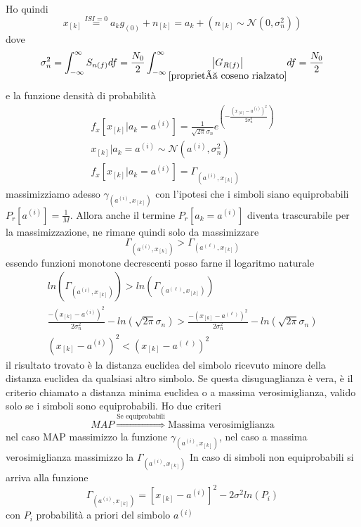             Ho quindi 
            \[
                x_{[k]} \overset{ISI=0}{=} a_kg_{(0)} + n_{[k]} = a_k + (n_{[k]} \sim \mathcal{N}(0,\sigma_n^2))
            \]
            dove 
            \[
                \sigma_n^2 = \int_{-\infty}^{\infty}S_{n(f)}df = \frac{N_0}{2} \int_{-\infty}^{\infty}\underset{\ref{proprietà coseno rialzato}}{\left| G_{R(f)} \right|} df = \frac{N_0}{2}  
            \]
            e la funzione densità di probabilità 
            \begin{gather}
                f_x[x_{[k]}|a_k = a^{(i)}] = \frac{1}{\sqrt{2\pi}\sigma_n}e^{\left(\displaystyle -\frac{(x_{[k]}-a^{(i)})^2}{2\sigma_n^2}\right)} \nonumber \\
                x_{[k]} | a_k = a^{(i)} \sim \mathcal{N}(a^{(i)},\sigma_n^2)\nonumber \\
                f_x[x_{[k]}|a_k = a^{(i)}] = \Gamma_{(a^{(i)},x_{[k]})} \nonumber
            \end{gather}
            massimizziamo adesso $\gamma_{(a^{(i)},x_{[k]})}$ con l'ipotesi che i simboli siano equiprobabili $P_r[a^{(i)}] = \frac{1}{M}$. Allora anche il termine
            $P_r[a_k = a^{(i)}]$ diventa trascurabile per la massimizzazione, ne rimane quindi solo da massimizzare
            \[
                \Gamma_{(a^{(i)},x_{[k]})} > \Gamma_{(a^{(\ell)},x_{[k]})}    
            \]
            essendo funzioni monotone decrescenti posso farne il logaritmo naturale
            \begin{gather}
                ln\left(\Gamma_{(a^{(i)},x_{[k]})} \right)> ln\left(\Gamma_{(a^{(\ell)},x_{[k]})}\right) \nonumber\\
                \frac{-\left(x_{[k]}-a^{(i)}\right)^2}{2\sigma_n^2}-ln\left(\sqrt{2\pi}\sigma_n\right) >  \frac{-\left(x_{[k]}-a^{(\ell)}\right)^2}{2\sigma_n^2}-ln\left(\sqrt{2\pi}\sigma_n\right)\nonumber \\
                \left(x_{[k]}-a^{(i)}\right)^2<\left(x_{[k]}-a^{(\ell)}\right)^2\nonumber    
            \end{gather}
            il risultato trovato è la distanza euclidea del simbolo ricevuto minore della distanza euclidea da qualsiasi altro simbolo. Se
            questa disuguaglianza è vera, è il criterio chiamato a distanza minima euclidea o a massima verosimiglianza, valido solo se i simboli
            sono equiprobabili. Ho due criteri 
            \[
                MAP \overset{\text{Se equiprobabili}}{\Rightarrow} \text{Massima verosimiglianza}  
            \] 
            nel caso MAP massimizzo la funzione $\gamma_{(a^{(i)},x_{[k]})}$, nel caso a massima verosimiglianza massimizzo la $\Gamma_{(a^{(i)},x_{[k]})}$ 
            In caso di simboli non equiprobabili si arriva alla funzione 
            \[
                \Gamma_{(a^{(i)},x_{[k]})} = \left[x_{[k]}-a^{(i)}\right]^2-2\sigma^2ln(P_i)
            \]
            con $P_i$ probabilità a priori del simbolo $a^{(i)}$
